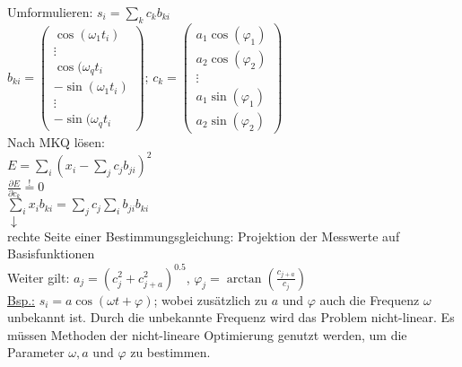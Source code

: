\begin{enumerate}
\hspace*{1cm} Umformulieren: $s_i=\sum\limits_k c_k b_{ki}$\\
\hspace*{2cm} $b_{ki}=\begin{pmatrix} \cos(\omega_1t_i) \\ \vdots \\ \cos(\omega_qt_i \\ -\sin(\omega_1t_i) \\ \vdots \\ -\sin(\omega_qt_i  \end{pmatrix}$; $c_k=\begin{pmatrix}  a_1 \cos(\varphi_1) \\  a_2 \cos(\varphi_2) \\ \vdots \\ a_1 \sin(\varphi_1) \\  a_2 \sin(\varphi_2) \end{pmatrix}$\\
\hspace*{1cm} Nach MKQ lösen: \\
\hspace*{1cm} $E= \sum\limits_i (x_i- \sum\limits_j c_j b_{ji})^2$\\
\hspace*{1cm} $\frac{\partial E}{\partial c_k}\stackrel{!}{=}0$\\
\hspace*{1cm} $\sum\limits_i x_i b_{ki}= \sum\limits_j c_j\sum\limits_i b_{ji}b_{ki}$\\
\hspace*{1.5cm} $\downarrow$\\
\hspace*{0.5cm} rechte Seite einer Bestimmungsgleichung: Projektion der Messwerte auf\\ \hspace*{0.5cm} Basisfunktionen\\
Weiter gilt:
 \hspace*{1cm} $a_j=(c_j^2+c_{j+a}^2)^{0.5}$, $ \varphi_j=\arctan(\frac{c_{j+a}}{c_j})$
\\ 
\underline{Bsp.:} $s_i=a \cos(\omega t + \varphi)$; wobei zusätzlich zu $a$ und $\varphi$ auch die Frequenz $\omega$ unbekannt ist. Durch die unbekannte Frequenz wird das Problem nicht-linear. Es müssen Methoden der nicht-lineare Optimierung genutzt werden, um die Parameter $\omega, a$ und $\varphi$ zu bestimmen.

\end{enumerate}
